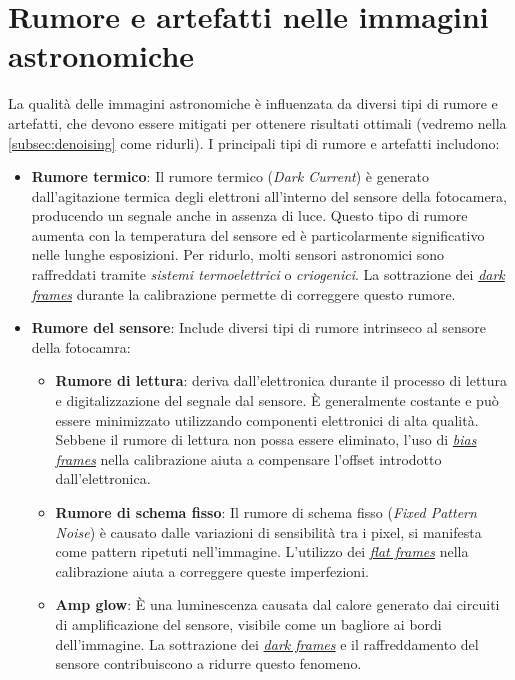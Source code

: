 \section{Rumore e artefatti nelle immagini astronomiche} \label{sec:noise}

La qualità delle immagini astronomiche è influenzata da diversi tipi di rumore e artefatti, che devono essere mitigati per ottenere risultati ottimali (vedremo nella \cref{subsec:denoising} come ridurli). I principali tipi di rumore e artefatti includono:

\begin{itemize}
    \item \textbf{Rumore termico}: Il rumore termico (\textit{Dark Current}) è generato dall'agitazione termica degli elettroni all'interno del sensore della fotocamera, producendo un segnale anche in assenza di luce. Questo tipo di rumore aumenta con la temperatura del sensore ed è particolarmente significativo nelle lunghe esposizioni. Per ridurlo, molti sensori astronomici sono raffreddati tramite \textit{sistemi termoelettrici} o \textit{criogenici}. La sottrazione dei \hyperref[subsec:dark]{\textit{dark frames}} durante la calibrazione permette di correggere questo rumore.
    
    \item \textbf{Rumore del sensore}: Include diversi tipi di rumore intrinseco al sensore della fotocamra:
    
    \begin{itemize}
        \item \textbf{Rumore di lettura}: deriva dall'elettronica durante il processo di lettura e digitalizzazione del segnale dal sensore. È generalmente costante e può essere minimizzato utilizzando componenti elettronici di alta qualità. Sebbene il rumore di lettura non possa essere eliminato, l'uso di \hyperref[subsec:bias]{\textit{bias frames}} nella calibrazione aiuta a compensare l'offset introdotto dall'elettronica.
        
        \item \textbf{Rumore di schema fisso}: Il rumore di schema fisso (\textit{Fixed Pattern Noise}) è causato dalle variazioni di sensibilità tra i pixel, si manifesta come pattern ripetuti nell'immagine. L'utilizzo dei \hyperref[subsec:flat]{\textit{flat frames}} nella calibrazione aiuta a correggere queste imperfezioni.
        
        \item \textbf{Amp glow}: È una luminescenza causata dal calore generato dai circuiti di amplificazione del sensore, visibile come un bagliore ai bordi dell'immagine. La sottrazione dei \hyperref[subsec:dark]{\textit{dark frames}} e il raffreddamento del sensore contribuiscono a ridurre questo fenomeno.
    \end{itemize}
    

\end{itemize}
